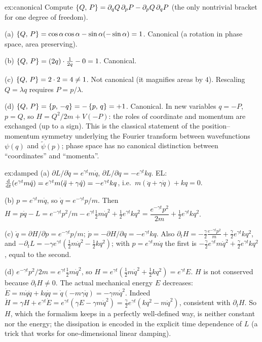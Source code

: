 \documentclass[11pt]{article}
\begin{document}
\begin{solution}{ex:canonical}
Compute $\left\{Q,\,P\right\}=\partial_qQ\,\partial_pP-\partial_pQ\,\partial_qP$ (the only nontrivial bracket for one degree of freedom).

(a) $\left\{Q,\,P\right\}=\cos\alpha\cos\alpha-\sin\alpha(-\sin\alpha)=1$. Canonical (a rotation in phase space, area preserving).

(b) $\left\{Q,\,P\right\}=(2q)\cdot\frac1{2q}-0=1$. Canonical.

(c) $\left\{Q,\,P\right\}=2\cdot2=4\ne1$. Not canonical (it magnifies areas by $4$). Rescaling $Q=\lambda q$ requires $P=p/\lambda$.

(d) $\left\{Q,\,P\right\}=\left\{p,\,-q\right\}=-\left\{p,\,q\right\}=+1$. Canonical. In new variables $q=-P$, $p=Q$, so $H=Q^2/2m+V(-P)$: the roles of coordinate and momentum are exchanged (up to a sign). This is the classical statement of the position--momentum symmetry underlying the Fourier transform between wavefunctions $\psi(q)$ and $\tilde\psi(p)$; phase space has no canonical distinction between ``coordinates'' and ``momenta''.
\end{solution}

\begin{solution}{ex:damped}
(a) $\partial L/\partial\dot q=e^{\gamma t}m\dot q$, $\partial L/\partial q=-e^{\gamma t}kq$. EL: $\frac{\mathrm{d} }{\mathrm{d} t}(e^{\gamma t}m\dot q)=e^{\gamma t}m(\ddot q+\gamma\dot q)=-e^{\gamma t}kq$, i.e.\ $m(\ddot q+\gamma\dot q)+kq=0$.

(b) $p=e^{\gamma t}m\dot q$, so $\dot q=e^{-\gamma t}p/m$. Then $H=p\dot q-L=e^{-\gamma t}p^2/m-e^{\gamma t}\tfrac12m\dot q^2+\tfrac12e^{\gamma t}kq^2=\dfrac{e^{-\gamma t}p^2}{2m}+\tfrac12e^{\gamma t}kq^2$.

(c) $\dot q=\partial H/\partial p=e^{-\gamma t}p/m$; $\dot p=-\partial H/\partial q=-e^{\gamma t}kq$. Also $\partial_tH=-\tfrac\gamma2\frac{e^{-\gamma t}p^2}{m}+\tfrac\gamma2e^{\gamma t}kq^2$, and $-\partial_tL=-\gamma e^{\gamma t}(\tfrac12m\dot q^2-\tfrac12kq^2)$; with $p=e^{\gamma t}m\dot q$ the first is $-\tfrac\gamma2e^{\gamma t}m\dot q^2+\tfrac\gamma2e^{\gamma t}kq^2$, equal to the second. \checkmark

(d) $e^{-\gamma t}p^2/2m=e^{\gamma t}\tfrac12m\dot q^2$, so $H=e^{\gamma t}(\tfrac12m\dot q^2+\tfrac12kq^2)=e^{\gamma t}E$. $H$ is not conserved because $\partial_tH\neq0$. The actual mechanical energy $E$ decreases: $\dot E=m\dot q\ddot q+kq\dot q=\dot q(-m\gamma\dot q)=-\gamma m\dot q^2$. Indeed $\dot H=\gamma H+e^{\gamma t}\dot E=e^{\gamma t}(\gamma E-\gamma m\dot q^2)=\tfrac{\gamma}2e^{\gamma t}(kq^2-m\dot q^2)$, consistent with $\partial_tH$. So $H$, which the formalism keeps in a perfectly well-defined way, is neither constant nor the energy; the dissipation is encoded in the explicit time dependence of $L$ (a trick that works for one-dimensional linear damping).
\end{solution}
\end{document}
